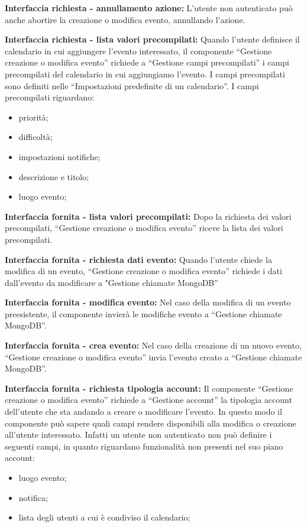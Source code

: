 \begin{listaPersonale}[DCI]{}
    \textbf{Interfaccia richiesta - annullamento azione:} L'utente non autenticato può anche abortire la creazione o modifica evento, annullando l'azione.

    \textbf{Interfaccia richiesta - lista valori precompilati:} Quando l'utente definisce il calendario in cui aggiungere l'evento interessato, il componente “Gestione creazione o modifica evento” richiede a “Gestione campi precompilati” i campi precompilati del calendario in cui aggiungiamo l'evento. I campi precompilati sono definiti nelle “Impostazioni predefinite di un calendario”.
    I campi precompilati riguardano:
    \begin{itemize}
        \item priorità;
        \item difficoltà;
        \item impostazioni notifiche;
        \item descrizione e titolo;
        \item luogo evento;
    \end{itemize}

    \textbf{Interfaccia fornita - lista valori precompilati:}  Dopo la richiesta dei valori precompilati, “Gestione creazione o modifica evento” riceve la lista dei valori precompilati.

    \textbf{Interfaccia fornita - richiesta dati evento:} Quando l'utente chiede la modifica di un evento, “Gestione creazione o modifica evento” richiede i dati dall'evento da modificare a "Gestione chiamate MongoDB”

    \textbf{Interfaccia fornita - modifica evento:} Nel caso della modifica di un evento preesistente, il componente invierà le modifiche evento a “Gestione chiamate MongoDB”.

    \textbf{Interfaccia fornita - crea evento:} Nel caso della creazione di un nuovo evento, “Gestione creazione o modifica evento” invia l'evento creato a “Gestione chiamate MongoDB”.

    \textbf{Interfaccia fornita - richiesta tipologia account:} Il componente “Gestione creazione o modifica evento” richiede a “Gestione account”  la tipologia account dell'utente che sta andando a creare o modificare l'evento. In questo modo il componente può sapere quali campi rendere disponibili alla modifica o creazione all'utente interessato. Infatti un utente non autenticato non può definire i seguenti campi, in quanto riguardano funzionalità non presenti nel suo piano account:
    \begin{itemize}
        \item luogo evento;
        \item notifica;
        \item lista degli utenti a cui è condiviso il calendario;
    \end{itemize}


\end{listaPersonale}
